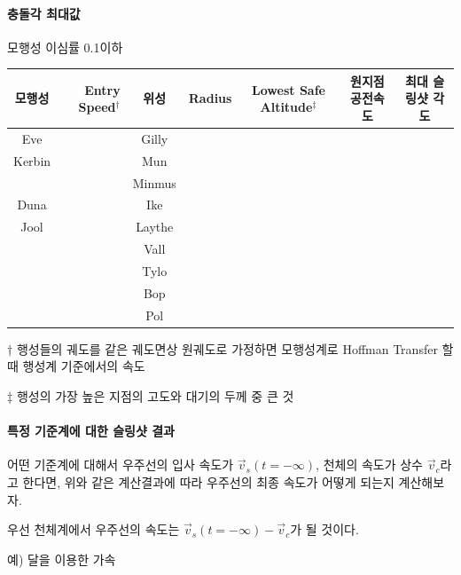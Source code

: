 \documentclass[9pt,twoside,openany]{amsbook}
\begin{document}
\paragraph{충돌각 최대값}
\begin{center}
\begin{adjustbox}{width=\textwidth}
\begin{threeparttable}
\caption{
모행성 이심률 0.1이하}
\begin{tabular}{|c|r|c|r|c|c|c|}
\hline
모행성&Entry Speed$^\dagger$& 위성& Radius& Lowest Safe Altitude$^\ddagger$&원지점 공전속도 &최대 슬링샷 각도
\\\hline
Eve&&Gilly
\\\hline
Kerbin&&Mun
\\&&Minmus
\\\hline
Duna&&Ike
\\\hline
Jool&&Laythe
\\&&Vall
\\&&Tylo
\\&&Bop
\\&&Pol
\\\hline
\end{tabular}
\begin{tablenotes}
\item[$\dagger$] 행성들의 궤도를 같은 궤도면상 원궤도로 가정하면 모행성계로 Hoffman Transfer 할 때 행성계 기준에서의 속도
\item[$\ddagger$] 행성의 가장 높은 지점의 고도와 대기의 두께 중 큰 것
\end{tablenotes}
\end{threeparttable}
\end{adjustbox}
\end{center}
\paragraph{특정 기준계에 대한 슬링샷 결과}
어떤 기준계에 대해서 우주선의 입사 속도가 $\vec{v}_s(t=-\infty)$, 천체의 속도가 상수 $\vec{v}_c$라고 한다면, 위와 같은 계산결과에 따라 우주선의 최종 속도가 어떻게 되는지 계산해보자.

우선 천체계에서 우주선의 속도는 $\vec{v}_s(t=-\infty)-\vec{v}_c$가 될 것이다.

예) 달을 이용한 가속
\end{document}
